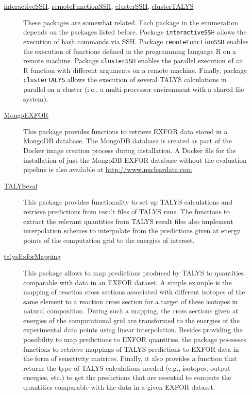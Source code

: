 \documentclass[12pt,a4paper]{scrartcl}
\begin{document}
 \begin{description}
 \item[\href{https://github.com/gschnabel/interactiveSSH}{interactiveSSH}, 
 \href{https://github.com/gschnabel/remoteFunctionSSH}{remoteFunctionSSH}, \href{https://github.com/gschnabel/clusterSSH}{clusterSSH}, 
 \href{https://github.com/gschnabel/clusterTALYS}{clusterTALYS}]
 These packages are somewhat related.
 Each package in the enumeration depends on the packages listed before.
 Package \verb#interactiveSSH# allows the execution of bash commands via SSH.
 Package \verb#remoteFunctionSSH# enables the execution of functions defined in the programming language R on a remote machine.
 Package \verb#clusterSSH# enables the parallel execution of an R function with different arguments on a remote machine.
 Finally, package \verb#clusterTALYS# allows the execution of several TALYS calculations in parallel on a cluster (i.e., a multi-processor environment with a shared file system).

  \item[\href{https://github.com/gschnabel/MongoEXFOR}{MongoEXFOR}]
  This package provides functions to retrieve EXFOR data stored in a MongoDB database.
  The MongoDB database is created as part of the Docker image creation process during installation.
  A Docker file for the installation of just the MongoDB EXFOR database without the evaluation pipeline is also available at \url{http://www.nucleardata.com}.

  \item[\href{https://github.com/gschnabel/TALYSeval}{TALYSeval}]
  This package provides functionality to set up TALYS calculations and retrieve predictions from result files of TALYS runs.
  The functions to extract the relevant quantities from TALYS result files also implement interpolation schemes to interpolate from the predictions given at energy points of the computation grid to the energies of interest.
  
  \item[\href{https://github.com/gschnabel/talysExforMapping}{talysExforMapping}]
  This package allows to map predictions produced by TALYS to quantities comparable with data in an EXFOR dataset.
  A simple example is the mapping of reaction cross sections associated with different isotopes of the same element to a reaction cross section for a target of these isotopes in natural composition.
  During such a mapping, the cross sections given at energies of the computational grid are transformed to the energies of the experimental data points using linear interpolation.
  Besides providing the possibility to map predictions to EXFOR quantities, the package possesses functions to retrieve mappings of TALYS predictions to EXFOR data in the form of sensitivity matrices.
  Finally, it also provides a function that returns the type of TALYS calculations needed (e.g., isotopes, output energies, etc.) to get the predictions that are essential to compute the quantities comparable with the data in a given EXFOR dataset.
  

\end{description}
\end{document}
